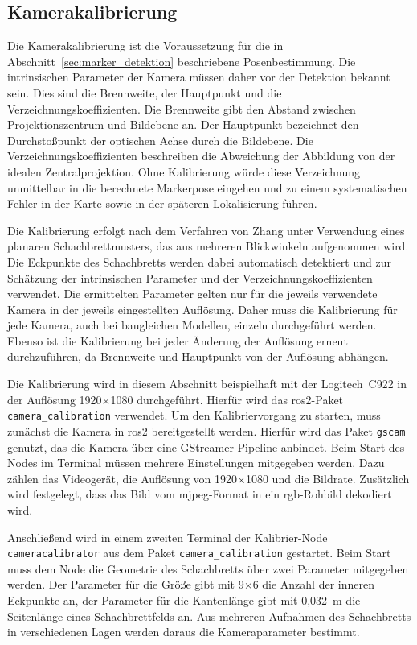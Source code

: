 \subsection{Kamerakalibrierung}
\label{sec:Kamera_Kalibrierung}
Die Kamerakalibrierung ist die Voraussetzung für die in Abschnitt~\ref{sec:marker_detektion} beschriebene Posenbestimmung.
Die intrinsischen Parameter der Kamera müssen daher vor der Detektion bekannt sein.
Dies sind die Brennweite, der Hauptpunkt und die Verzeichnungskoeffizienten.
Die Brennweite gibt den Abstand zwischen Projektionszentrum und Bildebene an.
Der Hauptpunkt bezeichnet den Durchstoßpunkt der optischen Achse durch die Bildebene.
Die Verzeichnungskoeffizienten beschreiben die Abweichung der Abbildung von der idealen Zentralprojektion.
Ohne Kalibrierung würde diese Verzeichnung unmittelbar in die berechnete Markerpose eingehen und zu einem systematischen 
Fehler in der Karte sowie in der späteren Lokalisierung führen.~\cite{888718_Calibration_Zhang,Bradski2008}

Die Kalibrierung erfolgt nach dem Verfahren von Zhang unter Verwendung 
eines planaren Schachbrettmusters, das aus mehreren Blickwinkeln aufgenommen wird.
Die Eckpunkte des Schachbretts werden dabei automatisch detektiert und zur Schätzung der intrinsischen Parameter und der Verzeichnungskoeffizienten verwendet.
Die ermittelten Parameter gelten nur für die jeweils verwendete Kamera in der jeweils eingestellten Auflösung.
Daher muss die Kalibrierung für jede Kamera, auch bei baugleichen Modellen, einzeln durchgeführt werden.
Ebenso ist die Kalibrierung bei jeder Änderung der Auflösung erneut durchzuführen, da Brennweite und Hauptpunkt von der Auflösung abhängen.~\cite{888718_Calibration_Zhang,Bradski2008}

Die Kalibrierung wird in diesem Abschnitt beispielhaft mit der Logitech~C922 in der Auflösung 1920$\times$1080 durchgeführt.
Hierfür wird das \gls{ros2}-Paket \texttt{camera\_calibration} verwendet.
Um den Kalibriervorgang zu starten, muss zunächst die Kamera in \gls{ros2} bereitgestellt werden.
Hierfür wird das Paket \texttt{gscam} genutzt, das die Kamera über eine GStreamer-Pipeline anbindet.
Beim Start des Nodes im Terminal müssen mehrere Einstellungen mitgegeben werden.
Dazu zählen das Videogerät, die Auflösung von 1920$\times$1080 und die Bildrate.
Zusätzlich wird festgelegt, dass das Bild vom \gls{mjpeg}-Format in ein \gls{rgb}-Rohbild dekodiert wird.

Anschließend wird in einem zweiten Terminal der Kalibrier-Node \texttt{cameracalibrator} aus dem Paket \texttt{camera\_calibration} gestartet.
Beim Start muss dem Node die Geometrie des Schachbretts über zwei Parameter mitgegeben werden.
Der Parameter für die Größe gibt mit 9$\times$6 die Anzahl der inneren Eckpunkte an, der Parameter für die Kantenlänge gibt mit 0,032~m die Seitenlänge eines Schachbrettfelds an.
Aus mehreren Aufnahmen des Schachbretts in verschiedenen Lagen werden daraus die Kameraparameter bestimmt.

